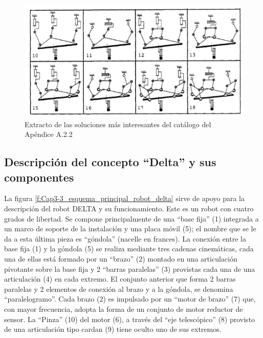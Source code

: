      \begin{figure}[htb]
        \centering
        \includegraphics[width=1\linewidth]{Main/Chapter3/Images3/3-3/soluciones-interesantes.png}
        \caption{Extracto de las soluciones más interesantes del catálogo del Apéndice A.2.2}
        \label{f:Cap3-3_soluciones_interesantes_catalogo}
    \end{figure}
    
    \subsection{Descripción del concepto ``Delta'' y sus componentes}
    La figura \ref{f:Cap3-3_esquema_principal_robot_delta} sirve de apoyo para la descripción del robot DELTA y su funcionamiento. Este es un robot con cuatro grados de libertad. Se compone principalmente de una ``base fija'' (1) integrada a un marco de soporte de la instalación y una placa móvil (5); el nombre que se le da a esta última pieza es ``góndola'' (nacelle en frances). La conexión entre la base fija (1) y la góndola (5) se realiza mediante tres cadenas cinemáticas, cada una de ellas está formado por un ``brazo'' (2) montado en una articulación pivotante sobre la base fija y 2 ``barras paralelas'' (3) provistas cada una de una articulación (4) en cada extremo. El conjunto anterior que forma 2 barras paralelas y 2 elementos de conexión al brazo y a la góndola, se denomina ``paralelogramo''. Cada brazo (2) es impulsado por un ``motor de brazo'' (7) que, con mayor frecuencia, adopta la forma de un conjunto de motor reductor de sensor. La ``Pinza'' (10) del motor (6), a través del ``eje telescópico'' (8) provisto de una articulación tipo cardan (9) tiene oculto uno de sus extremos.
    
